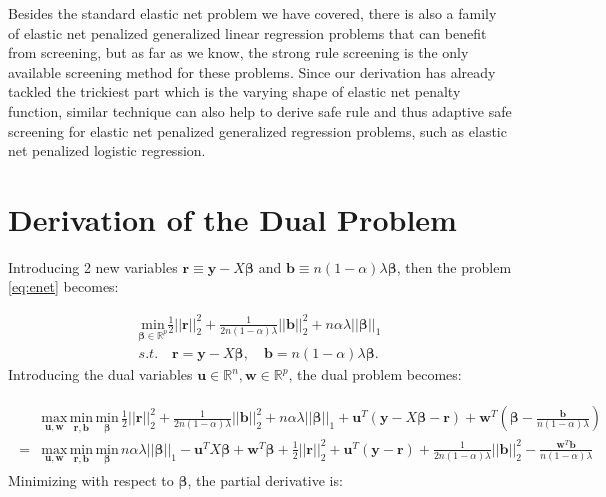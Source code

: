 Besides the standard elastic net problem we have covered, there is also a family of elastic net penalized generalized linear regression problems that can benefit from screening, but as far as we know, the strong rule screening is the only available screening method for these problems. Since our derivation has already tackled the trickiest part which is the varying shape of elastic net penalty function, similar technique can also help to derive safe rule and thus adaptive safe screening for elastic net penalized generalized regression problems, such as elastic net penalized logistic regression.

\appendix
\appendixpage

\section{Derivation of the Dual Problem}


Introducing 2 new variables $\boldsymbol r\equiv \boldsymbol y-X\boldsymbol\beta$ and $\boldsymbol b\equiv n(1-\alpha)\lambda \boldsymbol\beta$, then the problem \eqref{eq:enet} becomes:

\begin{equation}
    \label{eq:dual+rb}
    \begin{gathered}
    \underset{\boldsymbol\beta\in \mathbb{R}^p}{\mathrm{min}}\frac{1}{2}||\boldsymbol r||_2^2+\frac{1}{2n(1-\alpha)\lambda}||\boldsymbol b||_2^2+n\alpha\lambda||\boldsymbol\beta||_1\\s.t.\quad \boldsymbol r=\boldsymbol y-X\boldsymbol\beta,\quad \boldsymbol b=n(1-\alpha)\lambda \boldsymbol\beta.
\end{gathered}
\end{equation}
Introducing the dual variables $\boldsymbol u\in\mathbb{R}^{n},\boldsymbol w\in\mathbb{R}^p$, the dual problem becomes:

\begin{gather}
    \label{eq:dual+uw}
    \begin{aligned}
        &\underset{\boldsymbol u,\boldsymbol w}{\mathrm{max}}\,\underset{\boldsymbol r,\boldsymbol b}{\mathrm{min}}\,\underset{\boldsymbol\beta}{\mathrm{min}}\,\frac{1}{2}||\boldsymbol r||_2^2+\frac{1}{2n(1-\alpha)\lambda}||\boldsymbol b||_2^2+n\alpha\lambda||\boldsymbol\beta||_1+\boldsymbol u^T(\boldsymbol y-X\boldsymbol\beta-\boldsymbol r)+\boldsymbol w^T\left(\boldsymbol\beta-\frac{\boldsymbol b}{n(1-\alpha)\lambda}\right)\\
        =&\underset{\boldsymbol u,\boldsymbol w}{\mathrm{max}}\,\underset{\boldsymbol r,\boldsymbol b}{\mathrm{min}}\,\underset{\boldsymbol\beta}{\mathrm{min}}\,n\alpha\lambda||\boldsymbol\beta||_1-\boldsymbol u^TX\boldsymbol\beta+\boldsymbol w^T\boldsymbol\beta+\frac{1}{2}||\boldsymbol r||_2^2+\boldsymbol u^T(\boldsymbol y-\boldsymbol r)+\frac{1}{2n(1-\alpha)\lambda}||\boldsymbol b||_2^2-\frac{\boldsymbol w^T\boldsymbol b}{n(1-\alpha)\lambda}
    \end{aligned}    
\end{gather}
Minimizing with respect to $\boldsymbol\beta$, the partial derivative is:

